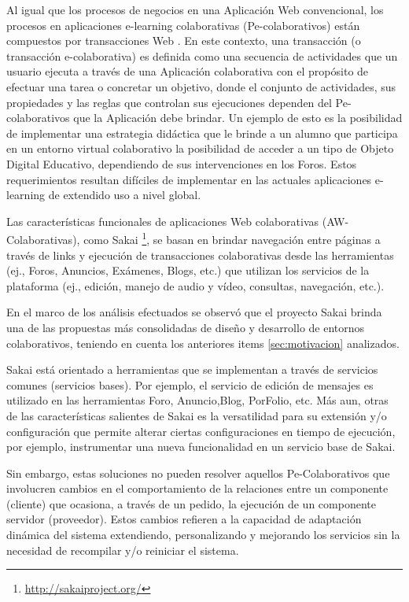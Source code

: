 Al igual que los procesos de negocios en una Aplicación Web
convencional, los procesos en aplicaciones e-learning colaborativas (Pe-colaborativos) están compuestos por transacciones Web \cite{cacic2007.7}. En este contexto, una transacción (o transacción
e-colaborativa) es definida como una secuencia de actividades que un usuario ejecuta a través de una Aplicación colaborativa con el propósito de efectuar una tarea o concretar un objetivo, donde el conjunto de actividades, sus propiedades y las reglas que controlan sus ejecuciones dependen del Pe-colaborativos que la
Aplicación debe brindar. Un ejemplo de esto es la posibilidad de implementar una
estrategia didáctica que le brinde a un alumno que participa en un entorno
virtual colaborativo la posibilidad de acceder a un tipo de Objeto Digital
Educativo, dependiendo de sus intervenciones en los Foros. 
Estos requerimientos resultan difíciles de implementar en las actuales
aplicaciones e-learning de extendido uso a nivel global.

Las características funcionales de aplicaciones Web
colaborativas (AW-Colaborativas), como
Sakai \footnote{\url{http://sakaiproject.org/}}, se basan en brindar
navegación entre páginas a través de links y ejecución de transacciones
colaborativas  desde las herramientas (ej., Foros, Anuncios, Exámenes, Blogs,
etc.) que utilizan los servicios de la plataforma (ej., edición, manejo de audio
y vídeo, consultas, navegación, etc.).

En el marco de los análisis efectuados se observó que el proyecto Sakai
brinda una de las propuestas más consolidadas de diseño y desarrollo de
entornos colaborativos, teniendo en cuenta los anteriores items
\ref{sec:motivacion} analizados.

Sakai está orientado a herramientas que se implementan a través de servicios
comunes (servicios bases). Por ejemplo, el servicio de edición de mensajes es
utilizado en las herramientas Foro, Anuncio,Blog, PorFolio, etc. Más aun, otras
de las características salientes de Sakai es la versatilidad para su extensión
y/o configuración que permite alterar ciertas configuraciones  en
tiempo de ejecución, por ejemplo, instrumentar una nueva funcionalidad en un
servicio base de Sakai.

Sin embargo, estas soluciones no pueden resolver aquellos Pe-Colaborativos que
involucren cambios en el comportamiento de la relaciones entre un componente
(cliente) que ocasiona, a través de un pedido, la ejecución de un componente
servidor (proveedor). Estos cambios refieren a la capacidad de
adaptación dinámica del sistema \cite{cacic2007.14} extendiendo, personalizando
y mejorando los servicios sin la necesidad de recompilar y/o reiniciar el
sistema. 

